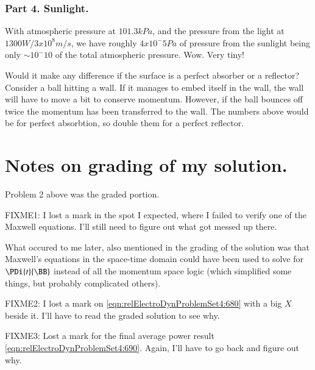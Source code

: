 \subsubsection{Part 4.  Sunlight.}

With atmospheric pressure at $101.3 k Pa$, and the pressure from the light at $1300 W/ 3 x 10^8 m/s$, we have roughly $4 x 10^-5 Pa$ of pressure from the sunlight being only $\sim 10^-{10}$ of the total atmospheric pressure.  Wow.  Very tiny!

Would it make any difference if the surface is a perfect absorber or a reflector?  Consider a ball hitting a wall.  If it manages to embed itself in the wall, the wall will have to move a bit to conserve momentum.  However, if the ball bounces off twice the momentum has been transferred to the wall.  The numbers above would be for perfect absorbtion, so double them for a perfect reflector.



\section{Notes on grading of my solution.}

Problem 2 above was the graded portion.

FIXME1: I lost a mark in the spot I expected, where I failed to verify one of the Maxwell equations.  I'll still need to figure out what got messed up there.

What occured to me later, also mentioned in the grading of the solution was that Maxwell's equations in the space-time domain could have been used to solve for $\PDi{t}{\BB}$ instead of all the momentum space logic (which simplified some things, but probably complicated others).

FIXME2: I lost a mark on \ref{eqn:relElectroDynProblemSet4:680} with a big $X$ beside it.  I'll have to read the graded solution to see why.

FIXME3: Lost a mark for the final average power result \ref{eqn:relElectroDynProblemSet4:690}.  Again, I'll have to go back and figure out why.

\EndArticle
